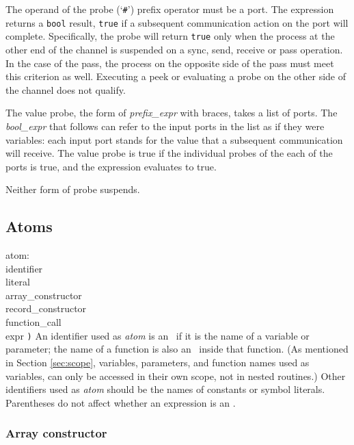 The operand of the probe (`{\tt{}\#}') prefix operator must be a port.
The expression
returns a {\tt{}bool} result, {\tt{}true} if a subsequent communication
action on the port will complete.  Specifically, the probe will return
{\tt{}true} only when the process at the other end of the channel is
suspended on a sync, send, receive or pass operation.  In the case of
the pass, the process on the opposite side of the pass must meet this
criterion as well.  Executing a peek or evaluating a probe on the other
side of the channel does not qualify.

The value probe, the form of {\it{}prefix\_expr} with braces, takes a list
of ports. The {\it{}bool\_expr} that follows can refer to the input ports in the
list as if they were variables: each input port stands for the value that
a subsequent communication will receive. The value probe is true if the
individual probes of the each of the ports is true, and the expression
evaluates to true.

Neither form of probe suspends.


\subsection{Atoms}\label{sec:atoms}

\grammarstart
atom: \\
       \>identifier \\
\orbox \>literal \\
\orbox \>array\_constructor \\
\orbox \>record\_constructor \\
\orbox \>function\_call \\
\orbox \>{\tt{}(} expr {\tt{})}
\grammarend
An identifier used as {\it{}atom} is an \lvalue\ if it is the name of
a variable or parameter; the name of a function is also an \lvalue\ inside
that function. (As mentioned in Section \ref{sec:scope}, variables, parameters,
and function names used as variables, can only be accessed in their own
scope, not in nested routines.)
Other identifiers used as {\it{}atom} should be the names
of constants or symbol literals. Parentheses do not affect whether
an expression is an \lvalue.

\subsubsection{Array constructor}\label{sec:arrayconstruct}

